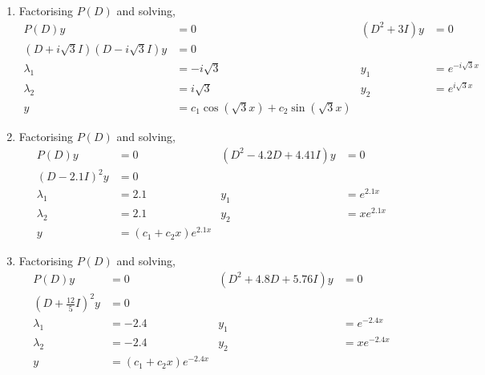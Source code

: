 \begin{enumerate}
    \item Factorising $ P(D) $ and solving,
          \begin{align}
              P(D)y                             & = 0                    &
              (D^{2} + 3I)y                     & = 0                      \\
              (D + i\sqrt{3}I)(D - i\sqrt{3}I)y & = 0                      \\
              \lambda_{1}                       & = -i\sqrt{3}           &
              y_{1}                             & = e^{-i\sqrt{3}x}        \\
              \lambda_{2}                       & = i\sqrt{3}            &
              y_{2}                             & = e^{i\sqrt{3}x}         \\
              y                                 & = c_{1}\cos(\sqrt{3}x)
              + c_{2}\sin(\sqrt{3}x)
          \end{align}

    \item Factorising $ P(D) $ and solving,
          \begin{align}
              P(D)y                   & = 0                        &
              (D^{2} - 4.2D + 4.41I)y & = 0                          \\
              (D - 2.1I)^{2}y         & = 0                          \\
              \lambda_{1}             & = 2.1                      &
              y_{1}                   & = e^{2.1x}                   \\
              \lambda_{2}             & = 2.1                      &
              y_{2}                   & = xe^{2.1x}                  \\
              y                       & = (c_{1} + c_{2}x)e^{2.1x}
          \end{align}

    \item Factorising $ P(D) $ and solving,
          \begin{align}
              P(D)y                                 & = 0                         &
              (D^{2} + 4.8D + 5.76I)y               & = 0                           \\
              \left( D + \frac{12}{5}I \right)^{2}y & = 0                           \\
              \lambda_{1}                           & = -2.4                      &
              y_{1}                                 & = e^{-2.4x}                   \\
              \lambda_{2}                           & = -2.4                      &
              y_{2}                                 & = xe^{-2.4x}                  \\
              y                                     & = (c_{1} + c_{2}x)e^{-2.4x}
          \end{align}


\end{enumerate}
